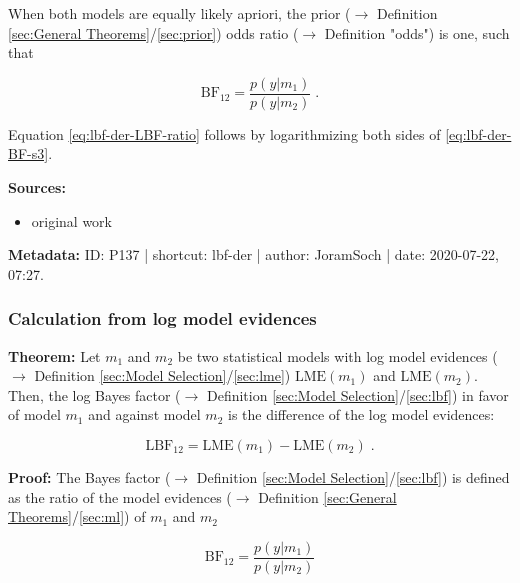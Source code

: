 \documentclass[a4paper,12pt,twoside]{book}
\begin{document}
When both models are equally likely apriori, the prior ($\rightarrow$ Definition \ref{sec:General Theorems}/\ref{sec:prior}) odds ratio ($\rightarrow$ Definition "odds") is one, such that

\begin{equation} \label{eq:lbf-der-BF-s3}
\mathrm{BF}_{12} = \frac{p(y|m_1)}{p(y|m_2)} \; .
\end{equation}

Equation \eqref{eq:lbf-der-LBF-ratio} follows by logarithmizing both sides of \eqref{eq:lbf-der-BF-s3}.


\vspace{1em}
\textbf{Sources:}
\begin{itemize}
\item original work\end{itemize}


\vspace{1em}
\textbf{Metadata:} ID: P137 | shortcut: lbf-der | author: JoramSoch | date: 2020-07-22, 07:27.
\vspace{1em}



\subsubsection[\textbf{Calculation from log model evidences}]{Calculation from log model evidences} \label{sec:lbf-lme}
\setcounter{equation}{0}

\textbf{Theorem:} Let $m_1$ and $m_2$ be two statistical models with log model evidences ($\rightarrow$ Definition \ref{sec:Model Selection}/\ref{sec:lme}) $\mathrm{LME}(m_1)$ and $\mathrm{LME}(m_2)$. Then, the log Bayes factor ($\rightarrow$ Definition \ref{sec:Model Selection}/\ref{sec:lbf}) in favor of model $m_1$ and against model $m_2$ is the difference of the log model evidences:

\begin{equation} \label{eq:lbf-lme-LBF-LME}
\mathrm{LBF}_{12} = \mathrm{LME}(m_1) - \mathrm{LME}(m_2) \; .
\end{equation}


\vspace{1em}
\textbf{Proof:} The Bayes factor ($\rightarrow$ Definition \ref{sec:Model Selection}/\ref{sec:lbf}) is defined as the ratio of the model evidences ($\rightarrow$ Definition \ref{sec:General Theorems}/\ref{sec:ml}) of $m_1$ and $m_2$

\begin{equation} \label{eq:lbf-lme-BF}
\mathrm{BF}_{12} = \frac{p(y|m_1)}{p(y|m_2)}
\end{equation}
\end{document}
